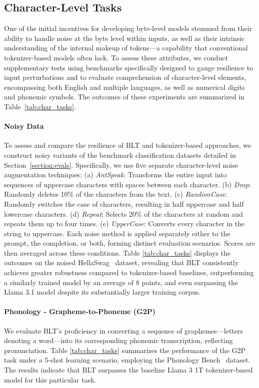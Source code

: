 \subsection{Character-Level Tasks}

One of the initial incentives for developing byte-level models stemmed from their ability to handle noise at the byte level within inputs, as well as their intrinsic understanding of the internal makeup of tokens—a capability that conventional tokenizer-based models often lack. To assess these attributes, we conduct supplementary tests using benchmarks specifically designed to gauge resilience to input perturbations and to evaluate comprehension of character-level elements, encompassing both English and multiple languages, as well as numerical digits and phonemic symbols. The outcomes of these experiments are summarized in Table~\ref{tab:char_tasks}.

\paragraph{Noisy Data} To assess and compare the resilience of {\textsc BLT} and tokenizer-based approaches, we construct noisy variants of the benchmark classification datasets detailed in Section~\ref{section:evals}. Specifically, we use five separate character-level noise augmentation techniques: (a) \textit{AntSpeak}: Transforms the entire input into sequences of uppercase characters with spaces between each character. (b) \textit{Drop}: Randomly deletes 10\% of the characters from the text. (c) \textit{RandomCase}: Randomly switches the case of characters, resulting in half uppercase and half lowercase characters. (d) \textit{Repeat}: Selects 20\% of the characters at random and repeats them up to four times. (e) \textit{UpperCase}: Converts every character in the string to uppercase. Each noise method is applied separately either to the prompt, the completion, or both, forming distinct evaluation scenarios. Scores are then averaged across these conditions. Table \ref{tab:char_tasks} displays the outcomes on the noised HellaSwag~\citep{Eval_hellaswag} dataset, revealing that {\textsc BLT} consistently achieves greater robustness compared to tokenizer-based baselines, outperforming a similarly trained model by an average of 8 points, and even surpassing the Llama 3.1 model despite its substantially larger training corpus.

\paragraph{Phonology - Grapheme-to-Phoneme (G2P)} We evaluate {\textsc BLT}'s proficiency in converting a sequence of graphemes—letters denoting a word—into its corresponding phonemic transcription, reflecting pronunciation. Table \ref{tab:char_tasks} summarizes the performance of the G2P task under a 5-shot learning scenario, employing the Phonology Bench~\citep{suvarna2024phonologybench} dataset. The results indicate that {\textsc BLT} surpasses the baseline Llama 3 1T tokenizer-based model for this particular task.


